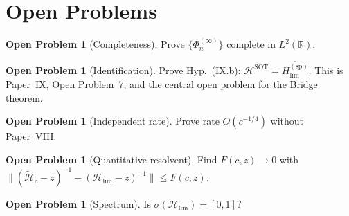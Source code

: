 \documentclass[12pt,a4paper]{amsart}
\theoremstyle{definition}
\newtheorem{problem}[theorem]{Open Problem}
\theoremstyle{remark}
\newcommand{\Hc}{\widetilde{\mathcal{H}}_c}
\newcommand{\Hlim}{\mathcal{H}_{\lim}}
\newcommand{\Hspectral}{H_{\lim}^{(\mathrm{sp})}}
\newcommand{\HSOT}{\mathcal{H}^{\mathrm{SOT}}}
\begin{document}
\section{Open Problems}
\label{sec:problems}

\begin{problem}[Completeness]
\label{prob:completeness}
Prove $\{\Phi_n^{(\infty)}\}$
complete in $L^2(\mathbb{R})$.
\end{problem}

\begin{problem}[Identification]
\label{prob:identification}
Prove Hyp.~\hyperref[IXb]{(IX.b)}:
$\HSOT=\overline{\Hspectral}$.
This is Paper~IX, Open Problem~7,
and the central open problem
for the Bridge theorem.
\end{problem}

\begin{problem}[Independent rate]
\label{prob:rate}
Prove rate $O(c^{-1/4})$ without
Paper~VIII.
\end{problem}

\begin{problem}[Quantitative
  resolvent]
\label{prob:resolvent}
Find $F(c,z)\to 0$ with
$\|(\Hc-z)^{-1}-(\Hlim-z)^{-1}\|
\le F(c,z)$.
\end{problem}

\begin{problem}[Spectrum]
\label{prob:spectrum}
Is $\sigma(\Hlim)=[0,1]$?
\end{problem}
\end{document}
